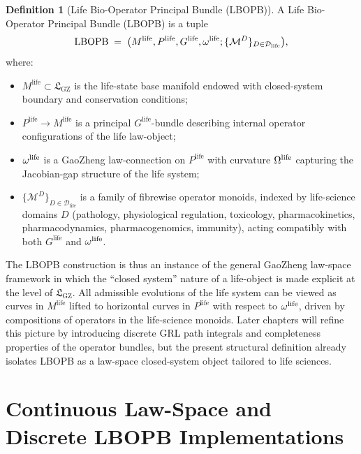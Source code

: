 \documentclass[11pt]{book}
\theoremstyle{plain}
\theoremstyle{definition}
\newtheorem{definition}[theorem]{Definition}
\theoremstyle{remark}
\newcommand{\GZLS}{\ensuremath{\mathfrak{L}_{\mathrm{GZ}}}}       \newcommand{\GZLT}{\ensuremath{M_{!w}}}                           \newcommand{\GZLOC}{\ensuremath{A_M}}                             \newcommand{\GZLCurv}{\ensuremath{\mathcal{F}_{\mathrm{law}}}}
\begin{document}
\begin{definition}[Life Bio-Operator Principal Bundle (LBOPB)]
A Life Bio-Operator Principal Bundle (LBOPB) is a tuple
\[
  \mathrm{LBOPB}
  \;=\;
  \bigl(
    M^{\mathrm{life}},
    P^{\mathrm{life}},
    G^{\mathrm{life}},
    \omega^{\mathrm{life}};
    \{\mathcal{M}^{D}\}_{D \in \mathcal{D}_{\mathrm{life}}}
  \bigr),
\]
where:
\begin{itemize}
  \item $M^{\mathrm{life}} \subset \GZLS$ is the life-state base
        manifold endowed with closed-system boundary and conservation
        conditions;
  \item $P^{\mathrm{life}} \to M^{\mathrm{life}}$ is a principal
        $G^{\mathrm{life}}$-bundle describing internal operator
        configurations of the life law-object;
  \item $\omega^{\mathrm{life}}$ is a GaoZheng law-connection on
        $P^{\mathrm{life}}$ with curvature $\Omega^{\mathrm{life}}$
        capturing the Jacobian-gap structure of the life system;
  \item $\{\mathcal{M}^{D}\}_{D \in \mathcal{D}_{\mathrm{life}}}$ is a
        family of fibrewise operator monoids, indexed by life-science
        domains $D$ (pathology, physiological regulation, toxicology,
        pharmacokinetics, pharmacodynamics, pharmacogenomics, immunity),
        acting compatibly with both $G^{\mathrm{life}}$ and
        $\omega^{\mathrm{life}}$.
\end{itemize}
\end{definition}

The LBOPB construction is thus an instance of the general
GaoZheng law-space framework in which the ``closed system'' nature of
a life-object is made explicit at the level of $\GZLS$. All admissible
evolutions of the life system can be viewed as curves in
$M^{\mathrm{life}}$ lifted to horizontal curves in $P^{\mathrm{life}}$
with respect to $\omega^{\mathrm{life}}$, driven by compositions of
operators in the life-science monoids. Later chapters will refine this
picture by introducing discrete GRL path integrals and completeness
properties of the operator bundles, but the present structural
definition already isolates LBOPB as a law-space closed-system object
tailored to life sciences.

\section{Continuous Law-Space and Discrete LBOPB Implementations}
\end{document}

